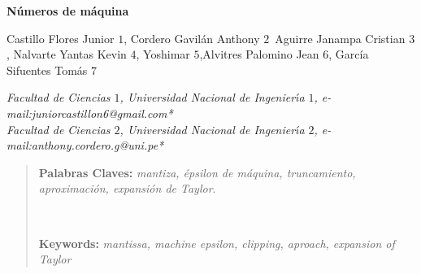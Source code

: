 \documentclass[10pt,a4paper]{article}
\begin{document}
\begin{center}
 {\Large \textbf{N\'umeros de m\'aquina }}
\end{center}
\begin{center}
 Castillo Flores Junior $1$, Cordero Gavil\'an Anthony $2$\, Aguirre Janampa Cristian $3$, Nalvarte Yantas Kevin $4$, Yoshimar $5$,Alvitres Palomino Jean $6$, Garc\'ia Sifuentes Tom\'as $7$\vskip12pt

{\it Facultad de Ciencias $1$, Universidad Nacional de Ingenier\'{\i}a $1$, e-mail:juniorcastillon6@gmail.com{*}\\
Facultad de Ciencias $2$, Universidad Nacional de Ingenier\'{\i}a $2$, e-mail:anthony.cordero.g@uni.pe{*}\\

}
\end{center}
\begin{quotation}
{\small

\textbf{Palabras Claves:} \textit{mantiza, \'epsilon de m\'aquina, truncamiento, aproximaci\'on, expansi\'on de Taylor}.
}\\
{\small
\hspace*{0.5cm} 

\textbf{Keywords:} \textit{mantissa, machine epsilon, clipping, aproach, expansion of Taylor} \\ 

}
\end{quotation}
\end{document}
